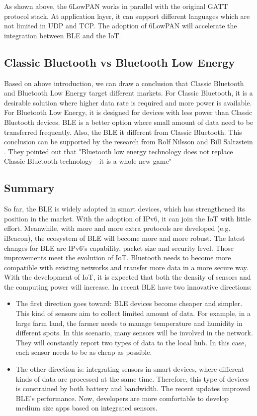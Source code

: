\documentclass{Nan_Thesis}
\begin{document}
As shown above, the 6LowPAN works in parallel with the original GATT protocol stack. At application layer, it can support different languages which are not limited in UDP and TCP. The adoption of 6LowPAN will accelerate the integration between BLE and the IoT.
\subsection{Classic Bluetooth vs Bluetooth Low Energy}
Based on above introduction, we can draw a conclusion that Classic Bluetooth and Bluetooth Low Energy target different markets. For Classic Bluetooth, it is a desirable solution where higher data rate is required and more power is available. For Bluetooth Low Energy, it is designed for devices with less power than Classic Bluetooth devices. BLE is a better option where small amount of data need to be transferred frequently. Also, the BLE it different from Classic Bluetooth. This conclusion can be supported by the research from Rolf Nilsson and Bill Saltzstein \cite{nilsson2012bluetooth}. They pointed out that "Bluetooth low energy technology does not replace Classic Bluetooth technology—it is a whole new game"
\subsection{Summary}  
So far, the BLE is widely adopted in smart devices, which has strengthened its position in the market. With the adoption of IPv6, it can join the IoT with little effort. Meanwhile, with more and more extra protocols are developed (e.g. iBeacon), the ecosystem of BLE will become more and more robust. The latest changes for BLE are IPv6's capability, packet size and security level. Those improvements meet the evolution of IoT. Bluetooth needs to become more compatible with existing networks and transfer more data in a more secure way.  With the development of IoT, it is expected that both the density of sensors and the computing power will increase. In recent BLE have two innovative directions:

\begin{itemize}
  \item The first direction goes toward: BLE devices become cheaper and simpler. This kind of sensors aim to collect limited amount of data. For example, in a large farm land, the farmer needs to manage temperature and humidity in different spots. In this scenario, many sensors will be involved in the network. They will constantly report two types of data to the local hub. In this case, each sensor needs to be as cheap as possible.  
  \item The other direction is: integrating sensors in smart devices, where different kinds of data are processed at the same time. Therefore, this type of devices is constrained by both battery and bandwidth. The recent updates improved BLE’s performance. Now, developers are more comfortable to develop medium size apps based on integrated sensors.
\end{itemize} 
\end{document}
